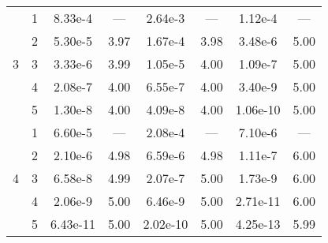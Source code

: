 \begin{table}
{\begin{tabular}{l c c c c c c c}
\midrule
\multirow{5}{*}{3}
 & 1 & 8.33e-4 & --- & 2.64e-3 & --- & 1.12e-4 & --- \\ 
 & 2 & 5.30e-5 & 3.97 & 1.67e-4 & 3.98 & 3.48e-6 & 5.00 \\ 
 & 3 & 3.33e-6 & 3.99 & 1.05e-5 & 4.00 & 1.09e-7 & 5.00 \\ 
 & 4 & 2.08e-7 & 4.00 & 6.55e-7 & 4.00 & 3.40e-9 & 5.00 \\ 
 & 5 & 1.30e-8 & 4.00 & 4.09e-8 & 4.00 & 1.06e-10 & 5.00 \\ 

\midrule
\multirow{5}{*}{4}
 & 1 & 6.60e-5 & --- & 2.08e-4 & --- & 7.10e-6 & --- \\ 
 & 2 & 2.10e-6 & 4.98 & 6.59e-6 & 4.98 & 1.11e-7 & 6.00 \\ 
 & 3 & 6.58e-8 & 4.99 & 2.07e-7 & 5.00 & 1.73e-9 & 6.00 \\ 
 & 4 & 2.06e-9 & 5.00 & 6.46e-9 & 5.00 & 2.71e-11 & 6.00 \\ 
 & 5 & 6.43e-11 & 5.00 & 2.02e-10 & 5.00 & 4.25e-13 & 5.99 \\ 

        \bottomrule
    \end{tabular}}
\end{table}
